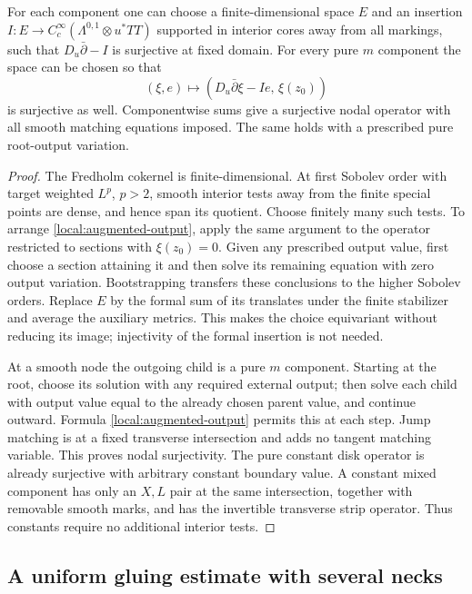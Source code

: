 \begin{lemma}\label{local:augmentation}
For each component one can choose a finite-dimensional space $E$ and
an insertion $I:E\to C_c^\infty(\Lambda^{0,1}\otimes u^*TT)$ supported
in interior cores away from all markings, such that $D_u\bar\partial-I$
is surjective at fixed domain.  For every pure $m$ component the space
can be chosen so that
\begin{equation}\label{local:augmented-output}
 (\xi,e)\longmapsto
 (D_u\bar\partial\xi-Ie,\,\xi(z_0))
\end{equation}
is surjective as well.  Componentwise sums give a surjective nodal
operator with all smooth matching equations imposed.  The same holds
with a prescribed pure root-output variation.
\end{lemma}
\begin{proof}
The Fredholm cokernel is finite-dimensional.  At first Sobolev order
with target weighted $L^p$, $p>2$, smooth interior tests away from the
finite special points are dense, and hence span its quotient.  Choose
finitely many such tests.  To arrange \eqref{local:augmented-output},
apply the same argument to the operator restricted to sections with
$\xi(z_0)=0$.  Given any prescribed output value, first choose a
section attaining it and then solve its remaining equation with zero
output variation.  Bootstrapping transfers these conclusions to the
higher Sobolev orders.  Replace $E$ by the formal sum of its translates
under the finite stabilizer and average the auxiliary metrics.  This
makes the choice equivariant without reducing its image; injectivity
of the formal insertion is not needed.

At a smooth node the outgoing child is a pure $m$ component.  Starting
at the root, choose its solution with any required external output;
then solve each child with output value equal to the already chosen
parent value, and continue outward.  Formula
\eqref{local:augmented-output} permits this at each step.  Jump
matching is at a fixed transverse intersection and adds no tangent
matching variable.  This proves nodal surjectivity.  The pure constant
disk operator is already surjective with arbitrary constant boundary
value.  A constant mixed component has only an $X,L$ pair at the same
intersection, together with removable smooth marks, and has the
invertible transverse strip operator.  Thus constants require no
additional interior tests.
\end{proof}

\subsection{A uniform gluing estimate with several necks}

